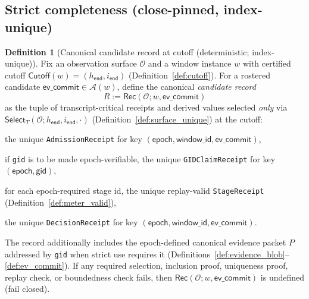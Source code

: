 \documentclass[11pt]{article}
\newcommand{\code}[1]{\texttt{#1}}
\newcommand{\term}[1]{\emph{#1}}
\newcommand{\1}{\mathbf{1}}
\theoremstyle{definition}
\newtheorem{definition}{Definition}
\theoremstyle{plain}
\begin{document}
\subsection{Strict completeness (close-pinned, index-unique)}


\begin{definition}[Canonical candidate record at cutoff (deterministic; index-unique)]
\label{def:cand_record}
Fix an observation surface $\mathcal{O}$ and a window instance $w$ with certified cutoff $\textsf{Cutoff}(w)=(h_{\textsf{end}},i_{\textsf{end}})$ (Definition~\ref{def:cutoff}).
For a rostered candidate $\textsf{ev\_commit}\in\mathcal{A}(w)$, define the canonical \term{candidate record}
\[
R := \mathsf{Rec}(\mathcal{O};w,\textsf{ev\_commit})
\]
as the tuple of transcript-critical receipts and derived values selected \emph{only} via $\mathsf{Select}_T(\mathcal{O};h_{\textsf{end}},i_{\textsf{end}},\cdot)$ (Definition~\ref{def:surface_unique}) at the cutoff:
\begin{tightitemize}
\item the unique \code{AdmissionReceipt} for key $(\textsf{epoch},\textsf{window\_id},\textsf{ev\_commit})$,
\item if \code{gid} is to be made epoch-verifiable, the unique \code{GIDClaimReceipt} for key $(\textsf{epoch},\textsf{gid})$,
\item for each epoch-required stage id, the unique replay-valid \code{StageReceipt} (Definition~\ref{def:meter_valid}),
\item the unique \code{DecisionReceipt} for key $(\textsf{epoch},\textsf{window\_id},\textsf{ev\_commit})$.
\end{tightitemize}
The record additionally includes the epoch-defined canonical evidence packet $P$ addressed by \code{gid} when strict use requires it (Definitions~\ref{def:evidence_blob}--\ref{def:ev_commit}).
If any required selection, inclusion proof, uniqueness proof, replay check, or boundedness check fails, then $\mathsf{Rec}(\mathcal{O};w,\textsf{ev\_commit})$ is undefined (fail closed).
\end{definition}
\end{document}
